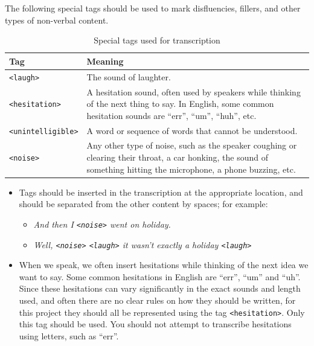 The following special tags should be used to mark disfluencies, fillers, and other types of non-verbal content.
\begin{table}[!ht]
    \centering
    \begin{tabular}{p{3cm}p{12cm}}
    \toprule
    \textbf{Tag} & \textbf{Meaning} \\ \midrule
    \texttt{<laugh>} & The sound of laughter. \\ 
\midrule
\texttt{<hesitation>} & A hesitation sound, often used by speakers while thinking of the next thing to say. In English, some common hesitation sounds are “err”, “um”, “huh”, etc. \\ 
\midrule
\texttt{<unintelligible>} & A word or sequence of words that cannot be understood.\\
\midrule
\texttt{<noise>} & Any other type of noise, such as the speaker coughing or clearing their throat, a car honking, the sound of something hitting the microphone, a phone buzzing, etc. \\
    \bottomrule
    \end{tabular}
    \caption{Special tags used for transcription}
    \label{tab:transcript_tags}
\end{table}
\begin{itemize}
    \item Tags should be inserted in the transcription at the appropriate location, and should be separated from the other content by spaces; for example:
    \begin{itemize}
        \item \textit{And then I \texttt{<noise>} went on holiday.}
        \item \textit{Well, \texttt{<noise>} \texttt{<laugh>} it wasn’t exactly a holiday \texttt{<laugh>}}
    \end{itemize}

\item When we speak, we often insert hesitations while thinking of the next idea we want to say. Some common hesitations in English are “err”, “um” and “uh”. Since these hesitations can vary significantly in the exact sounds and length used, and often there are no clear rules on how they should be written, for this project they should all be represented using the tag \texttt{<hesitation>}. Only this tag should be used. You should not attempt to transcribe hesitations using letters, such as “err”.
\end{itemize}


